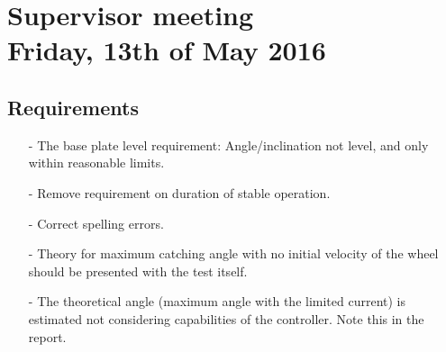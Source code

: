
\renewcommand{\vec}[1]{\boldsymbol{\mathbf{#1}}}

\renewcommand\chaptername{KAPITEL}
\renewcommand\contentsname{Indhold}
\renewcommand\figurename{Figur}
\renewcommand\tablename{Tabel}

\section*{Supervisor meeting\\ \small Friday, 13th of May 2016}

\subsection{Requirements}
\begin{itemize}
  \item[-] The base plate level requirement: Angle/inclination not level, and only within reasonable limits.
  \item[-] Remove requirement on duration of stable operation.
  \item[-] Correct spelling errors.
  \item[-] Theory for maximum catching angle with no initial velocity of the wheel should be presented with the test itself.
  \item[-] The theoretical angle (maximum angle with the limited current) is estimated not considering capabilities of the controller. Note this in the report.
\end{itemize}

